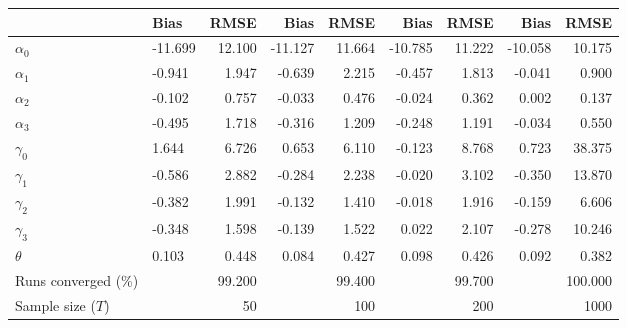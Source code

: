 
\begin{tabular}[t]{llrrrrrrr}
\toprule
  & Bias & RMSE & Bias & RMSE & Bias & RMSE & Bias & RMSE\\
\midrule
$\alpha_{0}$ & -11.699 & 12.100 & -11.127 & 11.664 & -10.785 & 11.222 & -10.058 & 10.175\\
$\alpha_{1}$ & -0.941 & 1.947 & -0.639 & 2.215 & -0.457 & 1.813 & -0.041 & 0.900\\
$\alpha_{2}$ & -0.102 & 0.757 & -0.033 & 0.476 & -0.024 & 0.362 & 0.002 & 0.137\\
$\alpha_{3}$ & -0.495 & 1.718 & -0.316 & 1.209 & -0.248 & 1.191 & -0.034 & 0.550\\
$\gamma_{0}$ & 1.644 & 6.726 & 0.653 & 6.110 & -0.123 & 8.768 & 0.723 & 38.375\\
$\gamma_{1}$ & -0.586 & 2.882 & -0.284 & 2.238 & -0.020 & 3.102 & -0.350 & 13.870\\
$\gamma_{2}$ & -0.382 & 1.991 & -0.132 & 1.410 & -0.018 & 1.916 & -0.159 & 6.606\\
$\gamma_{3}$ & -0.348 & 1.598 & -0.139 & 1.522 & 0.022 & 2.107 & -0.278 & 10.246\\
$\theta$ & 0.103 & 0.448 & 0.084 & 0.427 & 0.098 & 0.426 & 0.092 & 0.382\\
Runs converged (\%) &  & 99.200 &  & 99.400 &  & 99.700 &  & 100.000\\
Sample size ($T$) &  & 50 &  & 100 &  & 200 &  & 1000\\
\bottomrule
\end{tabular}
